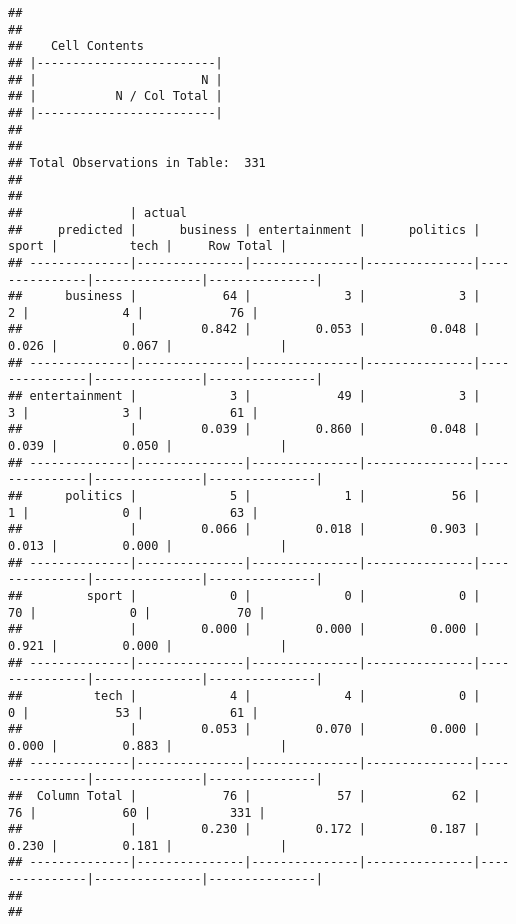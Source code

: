 \documentclass[
]{article}
\begin{document}
\begin{verbatim}
## 
##  
##    Cell Contents
## |-------------------------|
## |                       N |
## |           N / Col Total |
## |-------------------------|
## 
##  
## Total Observations in Table:  331 
## 
##  
##               | actual 
##     predicted |      business | entertainment |      politics |         sport |          tech |     Row Total | 
## --------------|---------------|---------------|---------------|---------------|---------------|---------------|
##      business |            64 |             3 |             3 |             2 |             4 |            76 | 
##               |         0.842 |         0.053 |         0.048 |         0.026 |         0.067 |               | 
## --------------|---------------|---------------|---------------|---------------|---------------|---------------|
## entertainment |             3 |            49 |             3 |             3 |             3 |            61 | 
##               |         0.039 |         0.860 |         0.048 |         0.039 |         0.050 |               | 
## --------------|---------------|---------------|---------------|---------------|---------------|---------------|
##      politics |             5 |             1 |            56 |             1 |             0 |            63 | 
##               |         0.066 |         0.018 |         0.903 |         0.013 |         0.000 |               | 
## --------------|---------------|---------------|---------------|---------------|---------------|---------------|
##         sport |             0 |             0 |             0 |            70 |             0 |            70 | 
##               |         0.000 |         0.000 |         0.000 |         0.921 |         0.000 |               | 
## --------------|---------------|---------------|---------------|---------------|---------------|---------------|
##          tech |             4 |             4 |             0 |             0 |            53 |            61 | 
##               |         0.053 |         0.070 |         0.000 |         0.000 |         0.883 |               | 
## --------------|---------------|---------------|---------------|---------------|---------------|---------------|
##  Column Total |            76 |            57 |            62 |            76 |            60 |           331 | 
##               |         0.230 |         0.172 |         0.187 |         0.230 |         0.181 |               | 
## --------------|---------------|---------------|---------------|---------------|---------------|---------------|
## 
## 
\end{verbatim}
\end{document}
